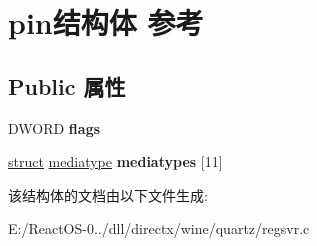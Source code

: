 \hypertarget{structpin}{}\section{pin结构体 参考}
\label{structpin}
\subsection*{Public 属性}
\begin{DoxyCompactItemize}
\item 
\mbox{\label{structpin_aaaa880102e5d05dbc569f6c18a701623}} 
D\+W\+O\+RD {\bfseries flags}
\item 
\mbox{\label{structpin_aa6ef226712ac5b761eaaca27c1a3118d}} 
\hyperlink{interfacestruct}{struct} \hyperlink{structmediatype}{mediatype} {\bfseries mediatypes} \mbox{[}11\mbox{]}
\end{DoxyCompactItemize}


该结构体的文档由以下文件生成\+:\begin{DoxyCompactItemize}
\item 
E\+:/\+React\+O\+S-\/0../dll/directx/wine/quartz/regsvr.\+c\end{DoxyCompactItemize}
